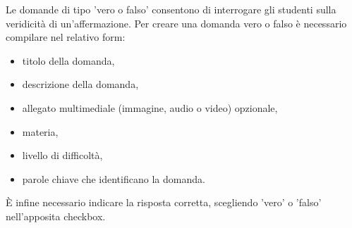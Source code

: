 \documentclass[a4paper, titlepage]{article}
\begin{document}
	 Le domande di tipo 'vero o falso' consentono di interrogare gli studenti sulla veridicità di un'affermazione. 
	 Per creare una domanda vero o falso è necessario compilare nel relativo form:
	 \begin{itemize}
 	 	\item titolo della domanda,
 	 	\item descrizione della domanda,
 	 	\item allegato multimediale (immagine, audio o video) opzionale,
 	 	\item materia,
 	 	\item livello di difficoltà,
 	 	\item parole chiave che identificano la domanda.
	 \end{itemize}
	 È infine necessario indicare la risposta corretta, scegliendo 'vero' o 'falso' nell'apposita checkbox.

	 
	 \newpage
\end{document}
